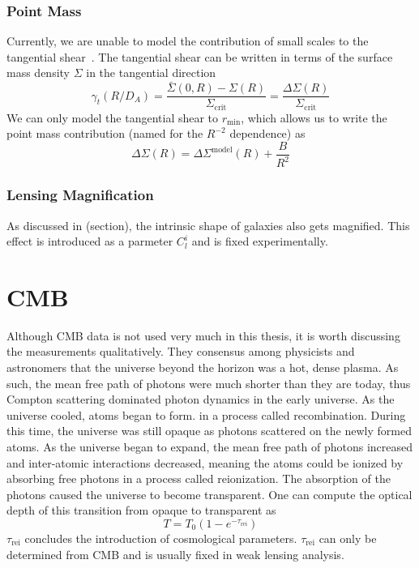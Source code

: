 \subsubsection{Point Mass}
Currently, we are unable to model the contribution of small scales to the tangential shear~\cite{maccrann_controlling_2020}. The tangential shear can be written in terms of the surface mass density $\Sigma$ in the tangential direction
\begin{equation}
	\gamma_t(R/D_A) = \frac{\bar\Sigma(0,R) - \Sigma(R)}{\Sigma_\mathrm{crit}} = \frac{\Delta\Sigma(R)}{\Sigma_\mathrm{crit}}
\end{equation}
We can only model the tangential shear to $r_\mathrm{min}$, which allows us to write the point mass contribution (named for the $R^{-2}$ dependence) as
\begin{equation}
	\Delta\Sigma(R) = \Delta\Sigma^{\mathrm{model}}(R) + \frac{B}{R^2}
\end{equation}
\subsubsection{Lensing Magnification}
As discussed in (section), the intrinsic shape of galaxies also gets magnified. This effect is introduced as a parmeter $C_l^i$ and is fixed experimentally.


\section{CMB}
Although CMB data is not used very much in this thesis, it is worth discussing the measurements qualitatively. They consensus among physicists and astronomers that the universe beyond the horizon was a hot, dense plasma. As such, the mean free path of photons were much shorter than they are today, thus Compton scattering dominated photon dynamics in the early universe. As the universe cooled, atoms began to form. in a process called recombination. During this time, the universe was still opaque as photons scattered on the newly formed atoms. As the universe began to expand, the mean free path of photons increased and inter-atomic interactions decreased, meaning the atoms could be ionized by absorbing free photons in a process called reionization. The absorption of the photons caused the universe to become transparent. One can compute the optical depth of this transition from opaque to transparent as
\begin{equation}
	T = T_0(1-e^{-\tau_{\mathrm{rei}}})
\end{equation}
$\tau_{\mathrm{rei}}$ concludes the introduction of cosmological parameters. $\tau_{\mathrm{rei}}$ can only be determined from CMB and is usually fixed in weak lensing analysis.

